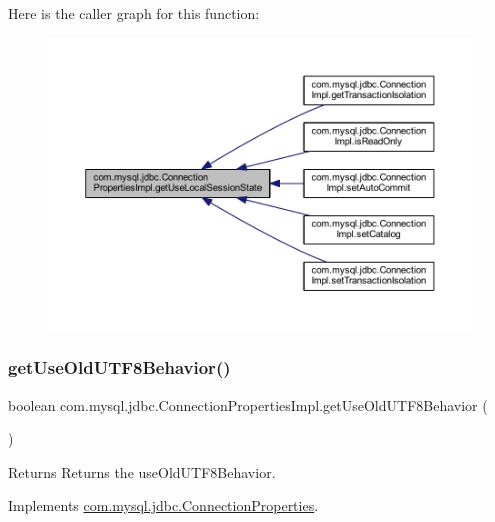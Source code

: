Here is the caller graph for this function\+:\nopagebreak
\begin{figure}[H]
\begin{center}
\leavevmode
\includegraphics[width=350pt]{classcom_1_1mysql_1_1jdbc_1_1_connection_properties_impl_aeb5f62adfbde0b6fcd7b43565abb6ed5_icgraph}
\end{center}
\end{figure}
\mbox{\label{classcom_1_1mysql_1_1jdbc_1_1_connection_properties_impl_a90d58fee4f3da4dcb8700798dc4a4ff0}} 
\subsubsection{\texorpdfstring{get\+Use\+Old\+U\+T\+F8\+Behavior()}{getUseOldUTF8Behavior()}}
{\footnotesize\ttfamily boolean com.\+mysql.\+jdbc.\+Connection\+Properties\+Impl.\+get\+Use\+Old\+U\+T\+F8\+Behavior (\begin{DoxyParamCaption}{ }\end{DoxyParamCaption})}

\begin{DoxyReturn}{Returns}
Returns the use\+Old\+U\+T\+F8\+Behavior. 
\end{DoxyReturn}


Implements \mbox{\hyperlink{interfacecom_1_1mysql_1_1jdbc_1_1_connection_properties_a4f8cf54b1bafd8f3e11f32f5c3609dd6}{com.\+mysql.\+jdbc.\+Connection\+Properties}}.

